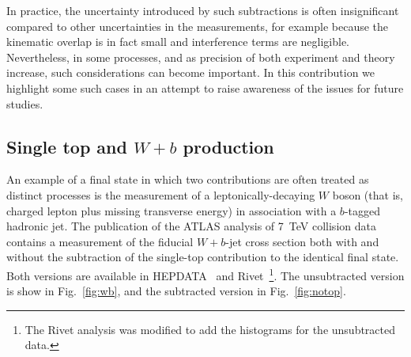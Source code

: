 \documentclass[11pt]{cernrep}
\begin{document}
In practice, the uncertainty introduced by such subtractions is often insignificant compared to other uncertainties in the measurements, 
for example because the kinematic overlap
is in fact small and interference terms are negligible. Nevertheless, in some processes, and as precision of both experiment
and theory increase, such considerations can become important. In this contribution we highlight some such cases in an attempt 
to raise awareness of the issues for future studies. 

\subsection{Single top and $W+b$ production}

An example of a final state in which two contributions are often treated as distinct processes is the measurement of a 
leptonically-decaying $W$ boson (that is, charged lepton plus missing transverse energy) in association with a $b$-tagged hadronic jet. 
The publication of the ATLAS analysis of 7~TeV collision data\cite{Aad:2013vka} contains a measurement of the fiducial $W+b$-jet 
cross section both with and without the subtraction of the single-top contribution to the identical final state. Both
versions are available in HEPDATA~\cite{hepdata} and Rivet~\cite{Buckley:2010ar}\footnote{The Rivet analysis was modified to add the histograms 
for the unsubtracted data.}. 
The unsubtracted version is show in Fig.~\ref{fig:wb}, and the subtracted version in Fig.~\ref{fig:notop}. 
\end{document}
